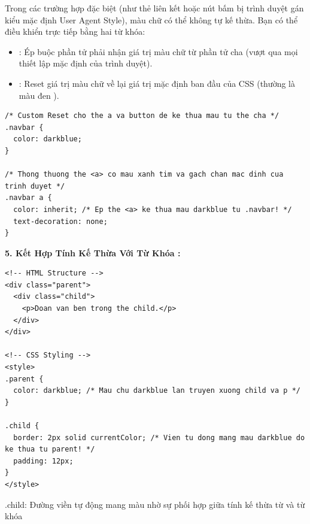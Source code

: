 \begin{conceptBox}
Trong các trường hợp đặc biệt (như thẻ liên kết  hoặc nút bấm  bị trình duyệt gán kiểu mặc định User Agent Style), màu chữ có thể không tự kế thừa. Bạn có thể điều khiển trực tiếp bằng hai từ khóa:
\begin{itemize}[leftmargin=1.5em, itemsep=3pt, parsep=0pt]
    \item \textbf{}: Ép buộc phần tử phải nhận giá trị màu chữ từ phần tử cha (vượt qua mọi thiết lập mặc định của trình duyệt).
    \item \textbf{}: Reset giá trị màu chữ về lại giá trị mặc định ban đầu của CSS (thường là màu đen ).
\end{itemize}
\end{conceptBox}

\begin{codeWindow}
\begin{lstlisting}[language=CSS3]
/* Custom Reset cho the a va button de ke thua mau tu the cha */
.navbar {
  color: darkblue;
}

/* Thong thuong the <a> co mau xanh tim va gach chan mac dinh cua trinh duyet */
.navbar a {
  color: inherit; /* Ep the <a> ke thua mau darkblue tu .navbar! */
  text-decoration: none;
}
\end{lstlisting}
\end{codeWindow}

\textbf{5. Kết Hợp Tính Kế Thừa Với Từ Khóa :}

\begin{codeWindow}
\begin{lstlisting}[language=HTML5]
<!-- HTML Structure -->
<div class="parent">
  <div class="child">
    <p>Doan van ben trong the child.</p>
  </div>
</div>

<!-- CSS Styling -->
<style>
.parent {
  color: darkblue; /* Mau chu darkblue lan truyen xuong child va p */
}

.child {
  border: 2px solid currentColor; /* Vien tu dong mang mau darkblue do ke thua tu parent! */
  padding: 12px;
}
</style>
\end{lstlisting}
\end{codeWindow}

\begin{browserWindow}
\vspace{2pt}
\begin{tcolorbox}[
    enhanced,
    colback=blue!5,
    colframe=blue!80!black,
    arc=6pt, boxrule=1.5pt,
    top=8pt, bottom=8pt, left=10pt, right=10pt,
    fontupper=\sffamily\bfseries\color{blue!80!black}
]
  .child: Đường viền tự động mang màu  nhờ sự phối hợp giữa tính kế thừa  từ  và từ khóa 
\end{tcolorbox}
\end{browserWindow}

